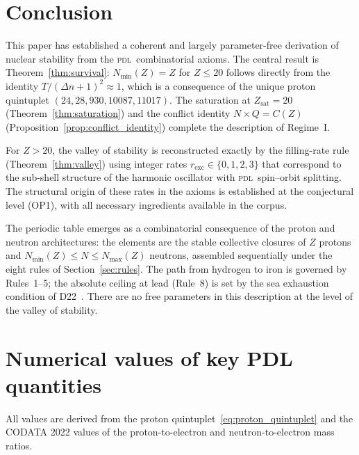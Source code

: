 \documentclass{article}
\theoremstyle{remark}
\newcommand{\PDL}{\textsc{pdl}}
\newcommand{\Zsat}{Z_{\mathrm{sat}}}
\newcommand{\Nmin}{N_{\min}}
\newcommand{\Nmax}{N_{\max}}
\newcommand{\Deltanop}{\Delta n}
\begin{document}
\section{Conclusion}
\label{sec:conclusion}

This paper has established a coherent and largely parameter-free derivation of nuclear stability from the \PDL\ combinatorial axioms. The central result is Theorem~\ref{thm:survival}: $\Nmin(Z) = Z$ for $Z \leq 20$ follows directly from the identity $T/(\Deltanop+1)^2 \approx 1$, which is a consequence of the unique proton quintuplet $(24,28,930,10087,11017)$. The saturation at $\Zsat = 20$ (Theorem~\ref{thm:saturation}) and the conflict identity $N \times Q = C(Z)$ (Proposition~\ref{prop:conflict_identity}) complete the description of Regime~I.

For $Z > 20$, the valley of stability is reconstructed exactly by the filling-rate rule (Theorem~\ref{thm:valley}) using integer rates $r_{\mathrm{exc}} \in \{0,1,2,3\}$ that correspond to the sub-shell structure of the harmonic oscillator with \PDL\ spin--orbit splitting. The structural origin of these rates in the axioms is established at the conjectural level (OP1), with all necessary ingredients available in the corpus.

The periodic table emerges as a combinatorial consequence of the proton and neutron architectures: the elements are the stable collective closures of $Z$ protons and $\Nmin(Z) \leq N \leq \Nmax(Z)$ neutrons, assembled sequentially under the eight rules of Section~\ref{sec:rules}. The path from hydrogen to iron is governed by Rules~1--5; the absolute ceiling at lead (Rule~8) is set by the sea exhaustion condition of D22~\cite{D22}. There are no free parameters in this description at the level of the valley of stability.

\appendix

\section{Numerical values of key PDL quantities}
\label{app:numerics}

All values are derived from the proton quintuplet~\eqref{eq:proton_quintuplet} and the CODATA 2022 values of the proton-to-electron and neutron-to-electron mass ratios.
\end{document}
